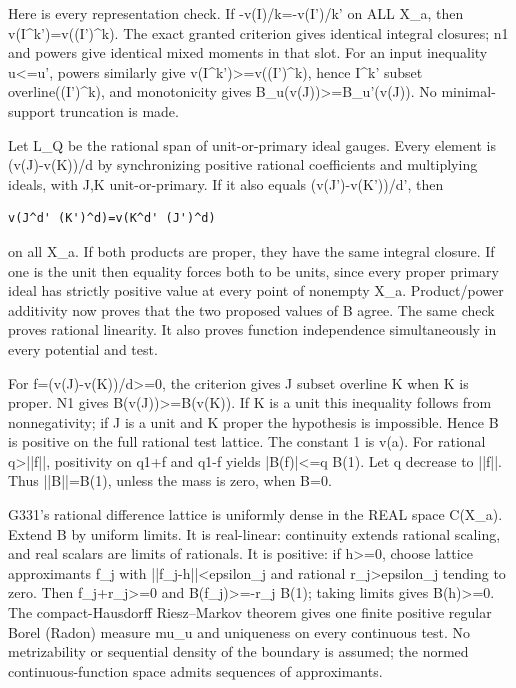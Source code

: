 \documentclass[11pt]{article}
\begin{document}
Here is every representation check. If -v(I)/k=-v(I')/k' on ALL X\_a, then v(I\textasciicircum{}k')=v((I')\textasciicircum{}k). The exact granted criterion gives identical integral closures; n1 and powers give identical mixed moments in that slot. For an input inequality u<=u', powers similarly give v(I\textasciicircum{}k')>=v((I')\textasciicircum{}k), hence I\textasciicircum{}k' subset overline((I')\textasciicircum{}k), and monotonicity gives B\_u(v(J))>=B\_u'(v(J)). No minimal-support truncation is made.

Let L\_Q be the rational span of unit-or-primary ideal gauges. Every element is (v(J)-v(K))/d by synchronizing positive rational coefficients and multiplying ideals, with J,K unit-or-primary. If it also equals (v(J')-v(K'))/d', then

\begin{Verbatim}[fontsize=\small,breaklines=true,breakanywhere=true]
v(J^d' (K')^d)=v(K^d' (J')^d)
\end{Verbatim}

on all X\_a. If both products are proper, they have the same integral closure. If one is the unit then equality forces both to be units, since every proper primary ideal has strictly positive value at every point of nonempty X\_a. Product/power additivity now proves that the two proposed values of B agree. The same check proves rational linearity. It also proves function independence simultaneously in every potential and test.

For f=(v(J)-v(K))/d>=0, the criterion gives J subset overline K when K is proper. N1 gives B(v(J))>=B(v(K)). If K is a unit this inequality follows from nonnegativity; if J is a unit and K proper the hypothesis is impossible. Hence B is positive on the full rational test lattice. The constant 1 is v(a). For rational q>||f||, positivity on q1+f and q1-f yields |B(f)|<=q B(1). Let q decrease to ||f||. Thus ||B||=B(1), unless the mass is zero, when B=0.

G331's rational difference lattice is uniformly dense in the REAL space C(X\_a). Extend B by uniform limits. It is real-linear: continuity extends rational scaling, and real scalars are limits of rationals. It is positive: if h>=0, choose lattice approximants f\_j with ||f\_j-h||<epsilon\_j and rational r\_j>epsilon\_j tending to zero. Then f\_j+r\_j>=0 and B(f\_j)>=-r\_j B(1); taking limits gives B(h)>=0. The compact-Hausdorff Riesz--Markov theorem gives one finite positive regular Borel (Radon) measure mu\_u and uniqueness on every continuous test. No metrizability or sequential density of the boundary is assumed; the normed continuous-function space admits sequences of approximants.
\end{document}
